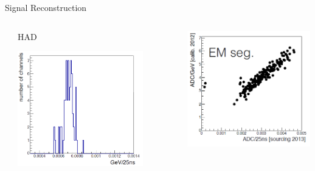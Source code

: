 \documentclass[pdf, 9pt]{beamer}
\begin{document}
\begin{frame}{Signal Reconstruction}
\begin{columns}[T]
\begin{column}{0.7\textwidth}
\begin{columns}[T]
\begin{column}{0.5\textwidth}
          \end{column}
          \begin{column}{0.5\textwidth}
            \vspace{0.01cm}
            \begin{center}
              HAD
            \end{center}
            \begin{flushleft}
              \includegraphics[width=0.8\textwidth, height=0.35\textheight]{figs/sourcing/2013/HFM_2013_Res_H.png}
            \end{flushleft}
          \end{column}
        \end{columns}
      \end{column}
      \begin{column}{0.3\textwidth}
        \includegraphics[width=0.99\textwidth, height=0.3\textheight]{figs/sourcing/2013/QIE_Res_EM.png}\\

\end{column}
\end{columns}
\end{frame}
\end{document}
